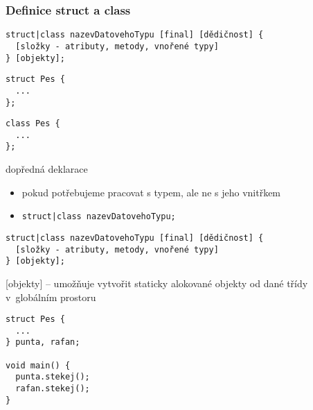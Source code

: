 \begin{frame}[fragile]
\frametitle{Definice struct a class}
\begin{noteblock}{}
\begin{lstlisting}
struct|class nazevDatovehoTypu [final] [dědičnost] {
  [složky - atributy, metody, vnořené typy]
} [objekty];
\end{lstlisting}
\end{noteblock}


\begin{twocols}
\begin{yesblock}
\begin{lstlisting}
struct Pes {
  ...
};
\end{lstlisting}
\end{yesblock}

\twocolssep

\begin{yesblock}
\begin{lstlisting}
class Pes {
  ...
};
\end{lstlisting}
\end{yesblock}
\end{twocols}

\begin{block}{dopředná deklarace}
\begin{itemize}
\item pokud potřebujeme pracovat s typem, ale ne s jeho vnitřkem
\item \lstinline!struct|class nazevDatovehoTypu;!
\end{itemize}
\end{block}

\end{frame}


\begin{frame}[fragile]
\begin{noteblock}{}
\begin{lstlisting}[basicstyle=\scriptsize]
struct|class nazevDatovehoTypu [final] [dědičnost] {
  [složky - atributy, metody, vnořené typy]
} [objekty];
\end{lstlisting}
\end{noteblock}

\begin{bitemize}
\item{} [objekty] -- umožňuje vytvořit staticky alokované objekty od dané třídy v~globálním prostoru
\end{bitemize}

\begin{yesblock}
\begin{lstlisting}
struct Pes {
  ...
} punta, rafan;

void main() { 
  punta.stekej(); 
  rafan.stekej(); 
}
\end{lstlisting}
\end{yesblock}
\end{frame}



